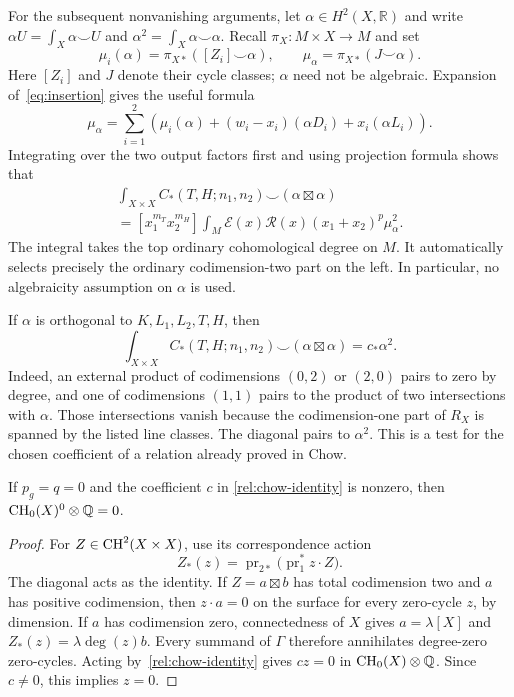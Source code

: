 For the subsequent nonvanishing arguments, let
$\alpha\in H^2(X,\mathbb R)$ and write
$\alpha U=\int_X\alpha\smile U$ and
$\alpha^2=\int_X\alpha\smile\alpha$.
Recall $\pi_X:M\times X\to M$ and set
\[
 \mu_i(\alpha)=\pi_{X*}([Z_i]\smile\alpha),\qquad
 \mu_\alpha=\pi_{X*}(J\smile\alpha).
\]
Here $[Z_i]$ and $J$ denote their cycle classes; $\alpha$ need not be
algebraic.  Expansion of~\eqref{eq:insertion} gives the useful formula
\begin{equation}
 \mu_\alpha=\sum_{i=1}^2
 \left(\mu_i(\alpha)+(w_i-x_i)(\alpha D_i)
                         +x_i(\alpha L_i)\right).
 \label{rel:mu-formula}
\end{equation}
Integrating over the two output factors first and using projection
formula shows that
\begin{multline}
 \int_{X\times X}C_*(T,H;n_1,n_2)
                   \smile(\alpha\boxtimes\alpha)\\
 = [x_1^{m_T}x_2^{m_H}]\int_M
 \mathcal E(x)\mathcal R(x)(x_1+x_2)^p\mu_\alpha^2.
 \label{rel:pairing}
\end{multline}
The integral takes the top ordinary cohomological degree on $M$.
It automatically selects precisely the ordinary codimension-two
part on the left.  In particular, no algebraicity assumption on
$\alpha$ is used.

If $\alpha$ is orthogonal to $K,L_1,L_2,T,H$, then
\begin{equation}
 \int_{X\times X}C_*(T,H;n_1,n_2)
                  \smile(\alpha\boxtimes\alpha)
 =c_*\alpha^2.
 \label{rel:orthogonal-test}
\end{equation}
Indeed, an external product of codimensions $(0,2)$ or $(2,0)$ pairs
to zero by degree, and one of codimensions $(1,1)$ pairs to the
product of two intersections with $\alpha$.  Those intersections
vanish because the codimension-one part of $R_X$ is spanned by the
listed line classes.  The diagonal pairs to $\alpha^2$.
This is a test for the chosen coefficient of a relation already
proved in Chow.

\begin{corollary}
\label{rel:correspondence}
If $p_g=q=0$ and the coefficient $c$ in
\eqref{rel:chow-identity} is nonzero, then
$\operatorname{CH}_0(X)^0\otimes\mathbb Q=0$.
\end{corollary}

\begin{proof}
For $Z\in\operatorname{CH}^2(X\times X)$, use its correspondence action
\[
 Z_*(z)=\operatorname{pr}_{2*}
       \bigl(\operatorname{pr}_1^*z\cdot Z\bigr).
\]
The diagonal acts as the identity.  If $Z=a\boxtimes b$ has total
codimension two and $a$ has positive codimension, then
$z\cdot a=0$ on the surface for every zero-cycle $z$, by dimension.
If $a$ has codimension zero, connectedness of $X$ gives
$a=\lambda[X]$ and $Z_*(z)=\lambda\deg(z)b$.
Every summand of $\Gamma$ therefore annihilates degree-zero
zero-cycles.  Acting by~\eqref{rel:chow-identity} gives $cz=0$ in
$\operatorname{CH}_0(X)\otimes\mathbb Q$.  Since $c\ne0$, this implies $z=0$.
\end{proof}
